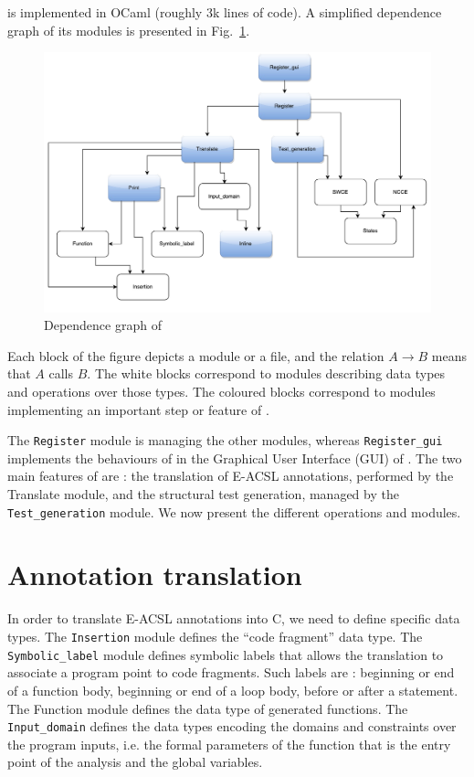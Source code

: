 \documentclass[web]{frama-c-book}
\begin{document}
\stady is implemented in OCaml (roughly 3k lines of code). A simplified dependence graph of its modules is presented in Fig.~\ref{fig:stady-deps}.

\begin{figure}\centering
  \includegraphics[scale=.5]{stady_architecture.pdf}
  \caption{Dependence graph of \stady\label{fig:stady-deps}}
\end{figure}

Each block of the figure depicts a module or a file, and the relation $A \rightarrow B$ means that $A$ calls $B$. The white blocks correspond to modules describing data types and operations over those types. The coloured blocks correspond to modules implementing an important step or feature of \stady.

The \lstinline[language=OCaml]'Register' module is managing the other modules, whereas \lstinline[language=OCaml]'Register_gui' implements the behaviours of \stady in the Graphical User Interface (GUI) of \framac. The two main features of \stady are : the translation of E-ACSL annotations, performed by the Translate module, and the structural test generation, managed by the \lstinline[language=OCaml]'Test_generation' module. We now present the different operations and modules.

\section{Annotation translation}

In order to translate E-ACSL annotations into C, we need to define specific data types. The \lstinline[language=OCaml]'Insertion' module defines the ``code fragment'' data type. The \lstinline[language=OCaml]'Symbolic_label' module defines symbolic labels that allows the translation to associate a program point to code fragments. Such labels are : beginning or end of a function body, beginning or end of a loop body, before or after a statement. The Function module defines the data type of generated functions. The \lstinline[language=OCaml]'Input_domain' defines the data types encoding the domains and constraints over the program inputs, i.e. the formal parameters of the function that is the entry point of the analysis and the global variables.
\end{document}
